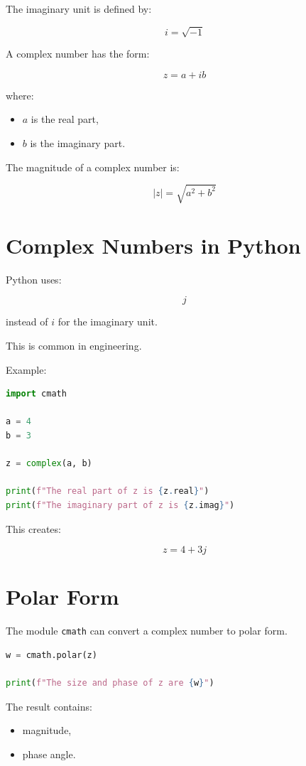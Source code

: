 \documentclass[11pt]{article}
\begin{document}
The imaginary unit is defined by:

\[
i = \sqrt{-1}
\]

A complex number has the form:

\[
z = a + ib
\]

where:

\begin{itemize}
    \item \(a\) is the real part,
    \item \(b\) is the imaginary part.
\end{itemize}

The magnitude of a complex number is:

\[
|z| = \sqrt{a^2 + b^2}
\]

\section{Complex Numbers in Python}

Python uses:

\[
j
\]

instead of \(i\) for the imaginary unit.

This is common in engineering.

Example:

\begin{lstlisting}[language=Python]
import cmath

a = 4
b = 3

z = complex(a, b)

print(f"The real part of z is {z.real}")
print(f"The imaginary part of z is {z.imag}")
\end{lstlisting}

This creates:

\[
z = 4 + 3j
\]

\section{Polar Form}

The module \texttt{cmath} can convert a complex number to polar form.

\begin{lstlisting}[language=Python]
w = cmath.polar(z)

print(f"The size and phase of z are {w}")
\end{lstlisting}

The result contains:

\begin{itemize}
    \item magnitude,
    \item phase angle.
\end{itemize}
\end{document}

